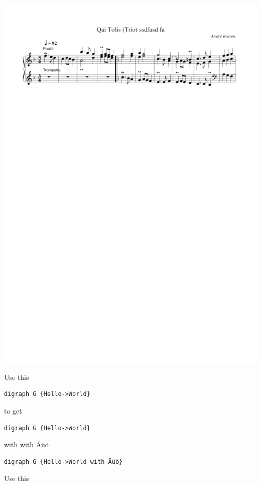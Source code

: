 \documentclass[]{article}
\begin{document}
\includegraphics{../abc-images/60a0ca71335f79026e9bea175f1a09b2361f4748.pdf}

Use this

\begin{verbatim}
digraph G {Hello->World}
\end{verbatim}

to get

\begin{verbatim}
digraph G {Hello->World}
\end{verbatim}

with with Äüö

\begin{verbatim}
digraph G {Hello->World with Äüö}
\end{verbatim}

Use this
\end{document}
